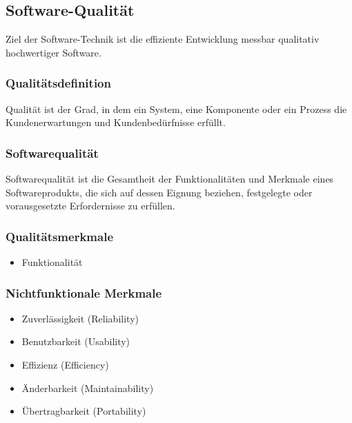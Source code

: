 	\subsection{Software-Qualität}
	Ziel der Software-Technik ist die effiziente Entwicklung messbar qualitativ hochwertiger Software.
	\par 
	\subsubsection{Qualitätsdefinition}
	Qualität ist der Grad, in dem ein System, eine Komponente oder ein Prozess die Kundenerwartungen und Kundenbedürfnisse erfüllt. 
	\subsubsection{Softwarequalität}
	Softwarequalität ist die Gesamtheit der Funktionalitäten und Merkmale eines Softwareprodukts, die sich auf dessen Eignung beziehen, festgelegte oder vorausgesetzte Erfordernisse zu erfüllen.
	\subsubsection{Qualitätsmerkmale}
	\begin{itemize}
		\item Funktionalität
	\end{itemize}
	\subsubsection{Nichtfunktionale Merkmale}
	\begin{itemize}
		\item Zuverlässigkeit (Reliability)
		\item Benutzbarkeit (Usability)
		\item Effizienz (Efficiency)
		\item Änderbarkeit (Maintainability)
		\item Übertragbarkeit (Portability)
	\end{itemize}
